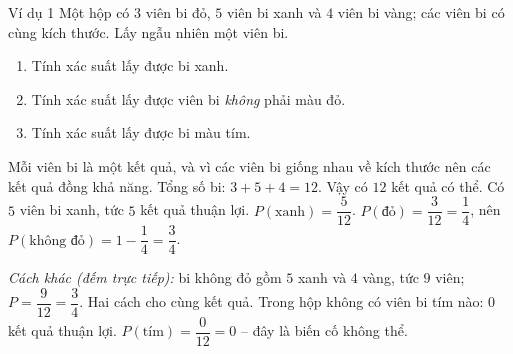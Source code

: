 \begin{exbox}{Ví dụ 1}
Một hộp có $3$ viên bi đỏ, $5$ viên bi xanh và $4$ viên bi vàng; các viên bi có cùng kích thước. Lấy ngẫu nhiên một viên bi.
\begin{enumerate}[label=\alph*),leftmargin=1.5em,itemsep=0pt,topsep=2pt]
\item Tính xác suất lấy được bi xanh.
\item Tính xác suất lấy được viên bi \emph{không} phải màu đỏ.
\item Tính xác suất lấy được bi màu tím.
\end{enumerate}
\guide
{}
Mỗi viên bi là một kết quả, và vì các viên bi giống nhau về kích thước nên các kết quả đồng khả năng. Tổng số bi: $3+5+4=12$. Vậy có $12$ kết quả có thể.
Có $5$ viên bi xanh, tức $5$ kết quả thuận lợi.
$P(\text{xanh})=\dfrac{5}{12}$.
$P(\text{đỏ})=\dfrac{3}{12}=\dfrac14$, nên $P(\text{không đỏ})=1-\dfrac14=\dfrac34$.

\emph{Cách khác (đếm trực tiếp):} bi không đỏ gồm $5$ xanh và $4$ vàng, tức $9$ viên; $P=\dfrac{9}{12}=\dfrac34$. Hai cách cho cùng kết quả.
Trong hộp không có viên bi tím nào: $0$ kết quả thuận lợi. $P(\text{tím})=\dfrac{0}{12}=0$ -- đây là biến cố không thể.
\end{exbox}

